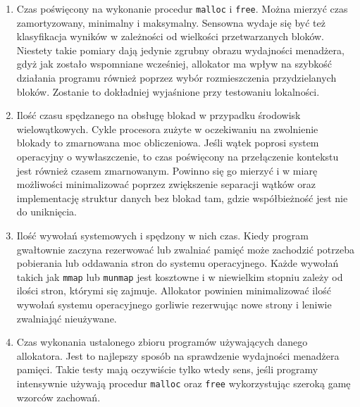 \documentclass[12pt,a4paper,titlepage,twoside]{mwart}
\begin{document}
\begin{enumerate}

\item Czas poświęcony na wykonanie procedur \texttt{malloc} i \texttt{free}.
Można mierzyć czas zamortyzowany, minimalny i maksymalny. Sensowna wydaje się
być też klasyfikacja wyników w zależności od wielkości przetwarzanych bloków.
Niestety takie pomiary dają jedynie zgrubny obrazu wydajności menadżera, gdyż
jak zostało wspomniane wcześniej, allokator ma wpływ na szybkość działania
programu również poprzez wybór rozmieszczenia przydzielanych bloków. Zostanie
to dokładniej wyjaśnione przy testowaniu lokalności.

\vspace{1ex}

\item Ilość czasu spędzanego na obsługę blokad w przypadku środowisk
wielowątkowych. Cykle procesora zużyte w oczekiwaniu na zwolnienie blokady to
zmarnowana moc obliczeniowa. Jeśli wątek poprosi system operacyjny o
wywłaszczenie, to czas poświęcony na przełączenie kontekstu jest również czasem
zmarnowanym. Powinno się go mierzyć i w miarę możliwości minimalizować poprzez
zwiększenie separacji wątków oraz implementację struktur danych bez blokad tam,
gdzie współbieżność jest nie do uniknięcia.

\vspace{1ex}

\item Ilość wywołań systemowych i spędzony w nich czas. Kiedy program
gwałtownie zaczyna rezerwować lub zwalniać pamięć może zachodzić potrzeba
pobierania lub oddawania stron do systemu operacyjnego. Każde wywołań takich
jak \texttt{mmap} lub \texttt{munmap} jest kosztowne i w niewielkim stopniu
zależy od ilości stron, którymi się zajmuje. Allokator powinien minimalizować
ilość wywołań systemu operacyjnego gorliwie rezerwując nowe strony i leniwie
zwalniająć nieużywane.

\vspace{1ex}

\item Czas wykonania ustalonego zbioru programów używających danego allokatora.
Jest to najlepszy sposób na sprawdzenie wydajności menadżera pamięci. Takie
testy mają oczywiście tylko wtedy sens, jeśli programy intensywnie używają
procedur \texttt{malloc} oraz \texttt{free} wykorzystując szeroką gamę wzorców
zachowań.

\end{enumerate}
\end{document}
